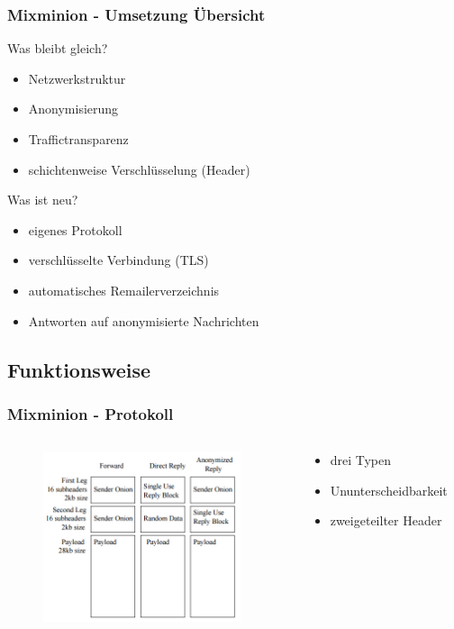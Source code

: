 \documentclass{beamer}
\begin{document}
\begin{frame}
	\frametitle{Mixminion - Umsetzung Übersicht}

	\begin{block}{Was bleibt gleich?}
		\begin{itemize}
			\item Netzwerkstruktur
			\item Anonymisierung
			\item Traffictransparenz
			\item schichtenweise Verschlüsselung (Header)
		\end{itemize}
	\end{block}

	\begin{block}{Was ist neu?}
		\begin{itemize}
			\item eigenes Protokoll
			\item verschlüsselte Verbindung (TLS)
			\item automatisches Remailerverzeichnis
			\item Antworten auf anonymisierte Nachrichten
		\end{itemize}
	\end{block}
\end{frame}

\subsection{Funktionsweise}
\begin{frame}
	\frametitle{Mixminion - Protokoll}

	\begin{columns}[T]
		\begin{column}{5cm}
			\begin{figure}
				\centering
				\includegraphics[height=5cm]{bilder/mixminion_messages.jpg}
			\end{figure}
		\end{column}
		\begin{column}{5cm}	
			\centering
			\begin{itemize}	
				\vspace{2cm}
				\item drei Typen
				\item Ununterscheidbarkeit
				\item zweigeteilter Header
			\end{itemize}
		\end{column}
	\end{columns}
\end{frame}
\end{document}
